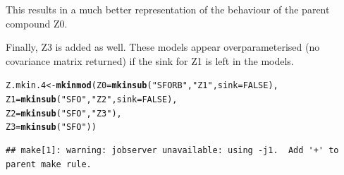 \documentclass[12pt,a4paper]{article}\usepackage[]{graphicx}\usepackage[]{color}
\makeatletter
\newcommand{\hlnum}[1]{\textcolor[rgb]{0.686,0.059,0.569}{#1}}%
\newcommand{\hlstr}[1]{\textcolor[rgb]{0.192,0.494,0.8}{#1}}%
\newcommand{\hlstd}[1]{\textcolor[rgb]{0.345,0.345,0.345}{#1}}%
\newcommand{\hlkwb}[1]{\textcolor[rgb]{0.69,0.353,0.396}{#1}}%
\newcommand{\hlkwc}[1]{\textcolor[rgb]{0.333,0.667,0.333}{#1}}%
\newcommand{\hlkwd}[1]{\textcolor[rgb]{0.737,0.353,0.396}{\textbf{#1}}}%
\newenvironment{kframe}{%
 \def\at@end@of@kframe{}%
 \ifinner\ifhmode%
  \def\at@end@of@kframe{\end{minipage}}%
  \begin{minipage}{\columnwidth}%
 \fi\fi%
 \def\FrameCommand##1{\hskip\@totalleftmargin \hskip-\fboxsep
 \colorbox{shadecolor}{##1}\hskip-\fboxsep
     \hskip-\linewidth \hskip-\@totalleftmargin \hskip\columnwidth}%
 \MakeFramed {\advance\hsize-\width
   \@totalleftmargin\z@ \linewidth\hsize
   \@setminipage}}%
 {\par\unskip\endMakeFramed%
 \at@end@of@kframe}
\newenvironment{knitrout}{}{} %
\makeatother
\begin{document}
This results in a much better representation of the behaviour of the parent 
compound Z0.

Finally, Z3 is added as well. These models appear overparameterised (no
covariance matrix returned) if the sink for Z1 is left in the models.

\begin{knitrout}
\color{fgcolor}\begin{kframe}
\begin{alltt}
\hlstd{Z.mkin.4} \hlkwb{<-} \hlkwd{mkinmod}\hlstd{(}\hlkwc{Z0} \hlstd{=} \hlkwd{mkinsub}\hlstd{(}\hlstr{"SFORB"}\hlstd{,} \hlstr{"Z1"}\hlstd{,} \hlkwc{sink} \hlstd{=} \hlnum{FALSE}\hlstd{),}
                    \hlkwc{Z1} \hlstd{=} \hlkwd{mkinsub}\hlstd{(}\hlstr{"SFO"}\hlstd{,} \hlstr{"Z2"}\hlstd{,} \hlkwc{sink} \hlstd{=} \hlnum{FALSE}\hlstd{),}
                    \hlkwc{Z2} \hlstd{=} \hlkwd{mkinsub}\hlstd{(}\hlstr{"SFO"}\hlstd{,} \hlstr{"Z3"}\hlstd{),}
                    \hlkwc{Z3} \hlstd{=} \hlkwd{mkinsub}\hlstd{(}\hlstr{"SFO"}\hlstd{))}
\end{alltt}
\begin{verbatim}
## make[1]: warning: jobserver unavailable: using -j1.  Add '+' to parent make rule.
\end{verbatim}



\end{kframe}
\end{knitrout}
\end{document}

